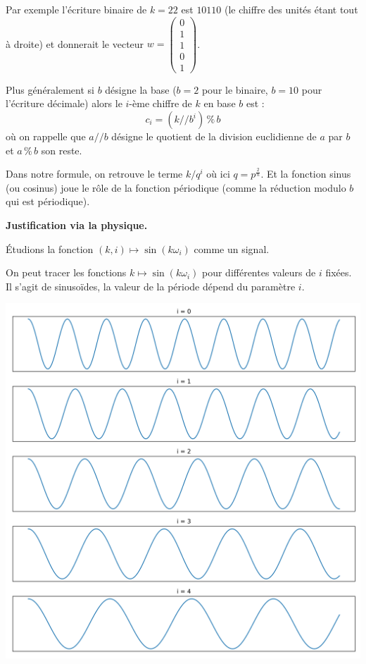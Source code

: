 \documentclass[11pt,class=report,crop=false]{standalone}
\begin{document}
Par exemple l'écriture binaire de $k=22$ est $10110$ (le chiffre des unités étant tout à droite) et donnerait le vecteur $w = \left(\begin{smallmatrix}0 \\ 1 \\ 1 \\ 0 \\ 1 \end{smallmatrix}\right)$.

Plus généralement si $b$ désigne la base ($b=2$ pour le binaire, $b=10$ pour l'écriture décimale) alors le $i$-ème chiffre de $k$ en base $b$ est :
\[
c_i = (k /\!/ b^i) \, \% \, b
\]
où on rappelle que $a /\!/ b$ désigne le quotient de la division euclidienne de $a$ par $b$ et $a \, \% \, b$ son reste.

Dans notre formule, on retrouve le terme $k / q^i$ où ici $q = p^{\frac{2}{n}}$. Et la fonction sinus (ou cosinus) joue le rôle de la fonction périodique (comme la réduction modulo $b$ qui est périodique).

\bigskip


\textbf{Justification via la physique.}

Étudions la fonction $(k,i) \mapsto \sin( k \omega_i)$ comme un signal.

On peut tracer les fonctions $k \mapsto \sin( k \omega_i)$ pour différentes valeurs de $i$ fixées. Il s'agit de sinusoïdes, la valeur de la période dépend du paramètre $i$.

\begin{center}
	\includegraphics[scale=\myscale,scale=0.4]{figures/position-icst}
\end{center}
\end{document}
